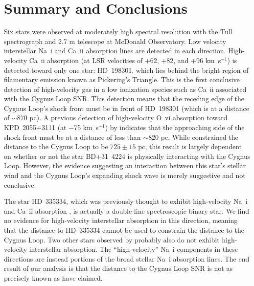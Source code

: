 \documentclass[fleqn,usenatbib]{mnras}
\begin{document}
\section{Summary and Conclusions}
Six stars were observed at moderately high spectral resolution with the Tull spectrograph and 2.7 m telescope at McDonald Observatory. Low velocity interstellar Na~{\sc i} and Ca~{\sc ii} absorption lines are detected in each direction. High-velocity Ca~{\sc ii} absorption (at LSR velocities of +62, +82, and +96 km~s$^{-1}$) is detected toward only one star: HD~198301, which lies behind the bright region of filamentary emission known as Pickering's Triangle. This is the first conclusive detection of high-velocity gas in a low ionization species such as Ca~{\sc ii} associated with the Cygnus Loop SNR. This detection means that the receding edge of the Cygnus Loop's shock front must be in front of HD~198301 (which is at a distance of $\sim$870 pc). A previous detection of high-velocity O~{\sc vi} absorption toward KPD~2055+3111 (at $-$75 km~s$^{-1}$) by \citet{b09} indicates that the approaching side of the shock front must be at a distance of less than $\sim$820 pc. While \citet{f21} constrained the distance to the Cygnus Loop to be $725\pm15$ pc, this result is largely dependent on whether or not the star BD+31~4224 is physically interacting with the Cygnus Loop. However, the evidence suggesting an interaction between this star's stellar wind and the Cygnus Loop's expanding shock wave is merely suggestive and not conclusive.

The star HD~335334, which was previously thought to exhibit high-velocity Na~{\sc i} and Ca~{\sc ii} absorption \citep{f18b}, is actually a double-line spectroscopic binary star. We find no evidence for high-velocity interstellar absorption in this direction, meaning that the distance to HD~335334 cannot be used to constrain the distance to the Cygnus Loop. Two other stars observed by \citet{f18b} probably also do not exhibit high-velocity interstellar absorption. The ``high-velocity'' Na~{\sc i} components in these directions are instead portions of the broad stellar Na~{\sc i} absorption lines. The end result of our analysis is that the distance to the Cygnus Loop SNR is not as precisely known as \citet{f21} have claimed.
\end{document}
